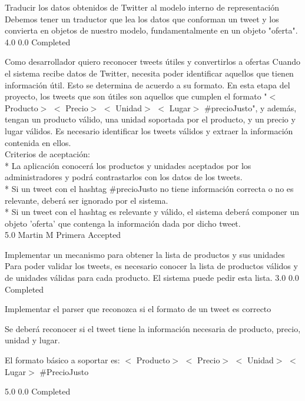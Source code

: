 		{Traducir los datos obtenidos de Twitter al modelo interno de representación} %
		{Debemos tener un traductor que lea los datos que conforman un tweet y los
convierta en objetos de nuestro modelo, fundamentalmente en un objeto
"oferta".
} %
		{4.0} %
		{} %
		{0.0} %
		{Completed} %


\vspace{20pt}

	{Como desarrollador quiero reconocer tweets útiles y convertirlos a ofertas} %
	{Cuando el sistema recibe datos de Twitter, necesita poder identificar aquellos
que tienen información útil. Esto se determina de acuerdo a su formato. En
esta etapa del proyecto, los tweets que son útiles son aquellos que cumplen el
formato "$<$ Producto$>$  $<$ Precio$>$  $<$ Unidad$>$  $<$ Lugar$>$  \#precioJusto", y además, tengan
un producto válido, una unidad soportada por el producto, y un precio y lugar
válidos. Es necesario identificar los tweets válidos y extraer la información
contenida en ellos.
  \\
Criterios de aceptación:\\
* La aplicación conocerá los productos y unidades aceptados por los administradores y podrá contrastarlos con los datos de los tweets.  \\
* Si un tweet con el hashtag \#precioJusto no tiene información correcta o no es relevante, deberá ser ignorado por el sistema.  \\
* Si un tweet con el hashtag es relevante y válido, el sistema deberá componer un objeto 'oferta' que contenga la información dada por dicho tweet.\\
} %
	{} %
	{5.0} %
	{Martin M} %
	{Primera} %
	{Accepted} %

		{Implementar un mecanismo para obtener la lista de productos y sus unidades} %
		{Para poder validar los tweets, es necesario conocer la lista de productos
válidos y de unidades válidas para cada producto. El sistema puede pedir esta
lista.
} %
		{3.0} %
		{} %
		{0.0} %
		{Completed} %

		{Implementar el parser que reconozca si el formato de un tweet es correcto} %
		{Se deberá reconocer si el tweet tiene la información necesaria de producto,
precio, unidad y lugar.

El formato básico a soportar es: $<$ Producto$>$  $<$ Precio$>$  $<$ Unidad$>$  $<$ Lugar$>$ 
\#PrecioJusto\\
} %
		{5.0} %
		{} %
		{0.0} %
		{Completed} %

